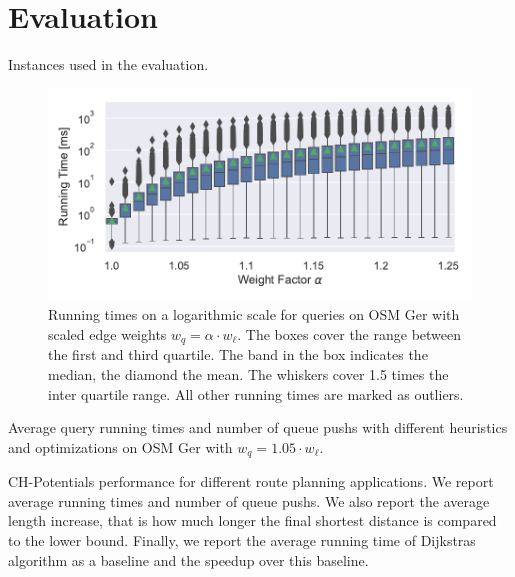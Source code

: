 \documentclass[letterpaper]{article} %
\begin{document}
\section{Evaluation}

\label{sec:experiments}

\begin{table}
\centering
\caption{Instances used in the evaluation.}\label{tab:graphs}

\end{table}

\begin{figure}
\centering
\includegraphics[width=\linewidth]{fig/scaled_weights.pdf}
\caption{
Running times on a logarithmic scale for queries on OSM Ger with scaled edge weights $w_q = \alpha \cdot w_\ell$.
The boxes cover the range between the first and third quartile.
The band in the box indicates the median, the diamond the mean.
The whiskers cover 1.5 times the inter quartile range.
All other running times are marked as outliers.
}\label{fig:scaled_weights}
\end{figure}

\begin{table}
\centering
\caption{Average query running times and number of queue pushs with different heuristics and optimizations on OSM Ger with $w_q = 1.05 \cdot w_\ell$.}\label{tab:building_blocks}

\end{table}

\begin{table}
\centering
\caption{
CH-Potentials performance for different route planning applications.
We report average running times and number of queue pushs.
We also report the average length increase, that is how much longer the final shortest distance is compared to the lower bound.
Finally, we report the average running time of Dijkstras algorithm as a baseline and the speedup over this baseline.
}\label{tab:applications}

\end{table}
\end{document}
